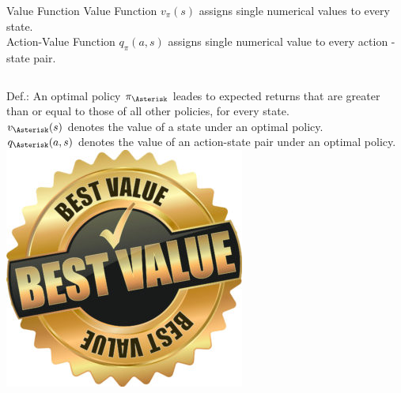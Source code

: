 \documentclass{beamer}
\begin{document}

\begin{frame}{Value Function}
	Value Function $v_{\pi} (s)$ assigns single numerical values to every state. \\
	Action-Value Function $q_{\pi} (a,s)$ assigns single numerical value to every action - state pair. \\[\baselineskip]
	\begin{columns}
			Def.: An optimal policy $\pi_{\Asterisk}$ leades to expected returns that are greater than or equal to those of all other policies, for every state.\\[\baselineskip]
			$v_{\Asterisk} (s)$ denotes the value of a state under an optimal policy. \\
			$q_{\Asterisk} (a,s)$ denotes the value of an action-state pair under an optimal policy.
			\includegraphics[width=0.8\linewidth]{Images/bestvalue.jpg}
	\end{columns}		
\end{frame}

\end{document}
